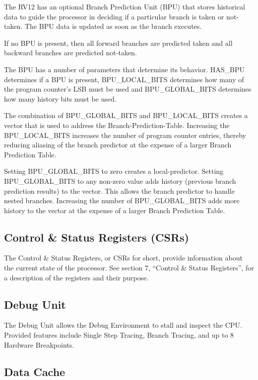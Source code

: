 The RV12 has an optional Branch Prediction Unit (BPU) that stores
historical data to guide the processor in deciding if a particular
branch is taken or not-taken. The BPU data is updated as soon as the
branch executes.

If no BPU is present, then all forward branches are predicted taken and
all backward branches are predicted not-taken.

The BPU has a number of parameters that determine its behavior. HAS\_BPU
determines if a BPU is present, BPU\_LOCAL\_BITS determines how many of
the program counter's LSB must be used and BPU\_GLOBAL\_BITS determines
how many history bits must be used.

The combination of BPU\_GLOBAL\_BITS and BPU\_LOCAL\_BITS creates a
vector that is used to address the Branch-Prediction-Table. Increasing
the BPU\_LOCAL\_BITS increases the number of program counter entries,
thereby reducing aliasing of the branch predictor at the expense of a
larger Branch Prediction Table.

Setting BPU\_GLOBAL\_BITS to zero creates a local-predictor. Setting
BPU\_GLOBAL\_BITS to any non-zero value adds history (previous branch
prediction results) to the vector. This allows the branch predictor to
handle nested branches. Increasing the number of BPU\_GLOBAL\_BITS adds
more history to the vector at the expense of a larger Branch Prediction
Table.

\subsection{Control \& Status Registers (CSRs)} \label{control-status-registers-csrs}

The Control \& Status Registers, or CSRs for short, provide information
about the current state of the processor. See section 7, ``Control \&
Status Registers'', for a description of the registers and their
purpose.

\subsection{Debug Unit}\label{debug-unit}

The Debug Unit allows the Debug Environment to stall and inspect the
CPU. Provided features include Single Step Tracing, Branch Tracing, and
up to 8 Hardware Breakpoints.

\subsection{Data Cache}\label{data-cache}

